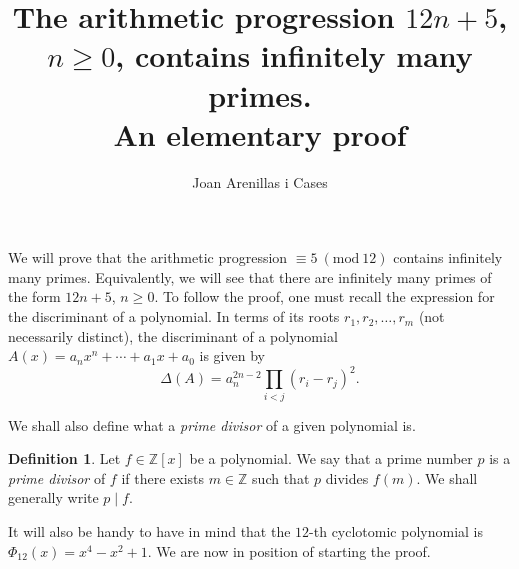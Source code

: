 \documentclass[a4paper, 12pt]{article}
\title{\textbf{The arithmetic progression $12n+5$, $n\geqslant0$, contains infinitely many primes.\\ An elementary proof}}
\date{\vspace{-5ex}}
\author[1]{Joan Arenillas i Cases}
\theoremstyle{definition}
\newtheorem{definition}[theorem]{Definition}
\theoremstyle{remark}
\newcommand{\Z}{\ensuremath{\mathbb{Z}}}
\newcommand{\Mod}[1]{\ (\mathrm{mod}\ #1)} %
\begin{document}
\maketitle
\sloppy
We will prove that the arithmetic progression $\equiv 5 \Mod{12}$ contains infinitely many primes. Equivalently, we will see that there are infinitely many primes of the form $12n+5$, $n\geqslant0$. To follow the proof, one must recall the expression for the discriminant of a polynomial. In terms of its roots $r_1,r_2,\dots,r_m$ (not necessarily distinct), the discriminant of a polynomial $A(x)=a_nx^n+\cdots+a_1x+a_0$ is given by
    \begin{equation}\label{discrim}
		\Delta(A)=a_n^{2n-2}\prod_{i<j}(r_i-r_j)^2.
	\end{equation}

We shall also define what a \emph{prime divisor} of a given polynomial is. 
\begin{definition}
Let $f\in\Z[x]$ be a polynomial. We say that a prime number $p$ is a \emph{prime divisor} of $f$ if there exists $m\in\Z$ such that $p$ divides $f(m)$. We shall generally write $p\mid f$.
\end{definition}

It will also be handy to have in mind that the $12$-th cyclotomic polynomial is $\Phi_{12}(x)=x^{4} - x^{2} + 1$. We are now in position of starting the proof.
\end{document}
